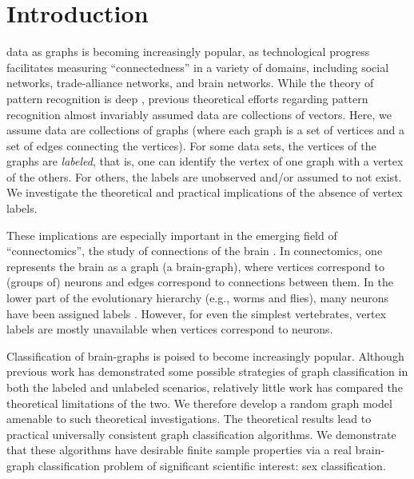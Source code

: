 \documentclass[10pt,journal,cspaper,compsoc]{IEEEtran}
\begin{document}
\maketitle
\IEEEdisplaynotcompsoctitleabstractindextext
\IEEEpeerreviewmaketitle



\section{Introduction} \label{sec:1}

 data as graphs is becoming increasingly popular, as technological progress facilitates measuring ``connectedness'' in a variety of domains, including social networks, trade-alliance networks, and brain networks.  While the theory of pattern recognition is deep \cite{Devroye1996}, previous theoretical efforts regarding pattern recognition almost invariably assumed data are collections of vectors.  Here, we assume data are collections of graphs (where each graph is a set of vertices and a set of edges connecting the vertices).  For some data sets, the vertices of the graphs are \emph{labeled}, that is, one can identify the vertex of one graph with a vertex of the others.  For others, the labels are unobserved and/or assumed to not exist.  We investigate the theoretical and practical implications of the absence of vertex labels.  

These implications are especially important in the emerging field of ``connectomics'', the study of connections of the brain \cite{Hagmann05, Sporns2010}.  In connectomics, one represents the brain as a graph (a brain-graph), where vertices correspond to (groups of) neurons and edges correspond to connections between them.  In the lower part of the evolutionary hierarchy (e.g., worms and flies), many neurons have been assigned labels \cite{WhiteBrenner86}.  However, for even the simplest vertebrates, vertex labels are mostly unavailable when vertices correspond to neurons.  

Classification of brain-graphs is poised to become increasingly popular.  Although previous work has demonstrated some possible strategies of graph classification in both the labeled \cite{VP11_sigsub} and unlabeled \cite{Duin2011} scenarios, relatively little work has compared the theoretical limitations of the two.  We therefore develop a random graph model amenable to such theoretical investigations.  The theoretical results lead to practical universally consistent graph classification algorithms.  We demonstrate that these algorithms have desirable finite sample properties via a real brain-graph classification problem of significant scientific interest: sex classification.
\end{document}
